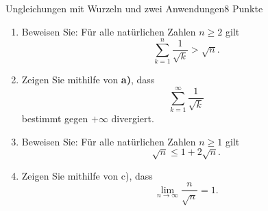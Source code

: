 \documentclass{../problemset}
\author{Michael van Straten}
\begin{document}
\maketitle

\begin{problem}{Ungleichungen mit Wurzeln und zwei Anwendungen}{8 Punkte}
\begin{enumerate}
	\item Beweisen Sie: Für alle natürlichen Zahlen $n \geq 2$ gilt
	      \[
		      \sum_{k=1}^{n} \frac{1}{\sqrt{k}} > \sqrt{n}.
	      \]

	\item Zeigen Sie mithilfe von \textbf{a)}, dass \[
		      \sum_{k=1}^{\infty} \frac{1}{\sqrt{k}}
	      \] bestimmt gegen $+\infty$ divergiert.

	\item Beweisen Sie: Für alle natürlichen Zahlen $n \geq 1$ gilt
	      \[
		      \sqrt{n} \leq 1 + 2\sqrt{n}.
	      \]

	\item Zeigen Sie mithilfe von c), dass
	      \[
		      \lim_{{n\to\infty}} \frac{n}{\sqrt{n}} = 1.
	      \]
\end{enumerate}


\end{problem}
\end{document}
